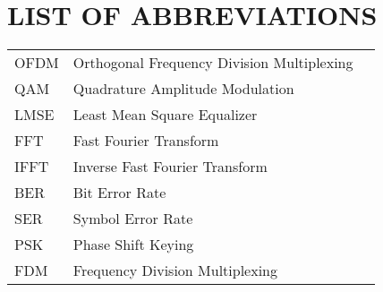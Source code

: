 \section*{LIST OF ABBREVIATIONS}
 {}

\begin{tabularx}{\textwidth}{ L{0.4} L{1.3} L{1.3} }
    OFDM & Orthogonal Frequency Division Multiplexing \\
    QAM & Quadrature Amplitude Modulation \\
    LMSE & Least Mean Square Equalizer \\ %
    FFT & Fast Fourier Transform \\
    IFFT & Inverse Fast Fourier Transform \\
    BER & Bit Error Rate \\
    SER & Symbol Error Rate \\
    PSK & Phase Shift Keying \\
    FDM & Frequency Division Multiplexing\\
\end{tabularx}

\newpage